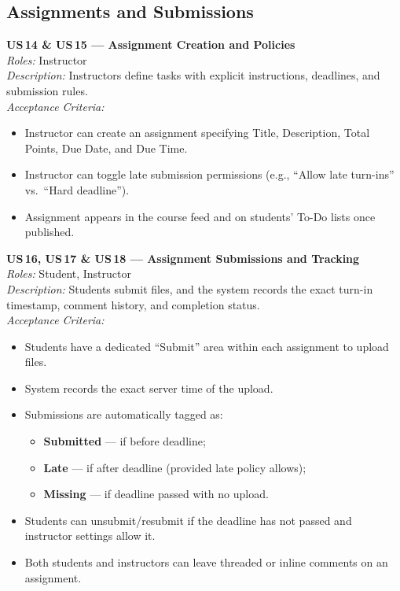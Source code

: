 \documentclass[12pt, a4paper]{article}
\begin{document}
\subsection{Assignments and Submissions}

\begin{userstory}
  \textbf{US\,14 \& US\,15 — Assignment Creation and Policies}\\[4pt]
  \textit{Roles:} Instructor\\[2pt]
  \textit{Description:} Instructors define tasks with explicit instructions,
  deadlines, and submission rules.\\[4pt]
  \textit{Acceptance Criteria:}
  \begin{itemize}
    \item Instructor can create an assignment specifying Title, Description,
          Total Points, Due Date, and Due Time.
    \item Instructor can toggle late submission permissions (e.g., ``Allow
          late turn-ins'' vs.\ ``Hard deadline'').
    \item Assignment appears in the course feed and on students' To-Do lists
          once published.
  \end{itemize}
\end{userstory}

\begin{userstory}
  \textbf{US\,16, US\,17 \& US\,18 — Assignment Submissions and Tracking}\\[4pt]
  \textit{Roles:} Student, Instructor\\[2pt]
  \textit{Description:} Students submit files, and the system records the
  exact turn-in timestamp, comment history, and completion status.\\[4pt]
  \textit{Acceptance Criteria:}
  \begin{itemize}
    \item Students have a dedicated ``Submit'' area within each assignment to
          upload files.
    \item System records the exact server time of the upload.
    \item Submissions are automatically tagged as:\
      \begin{itemize}
        \item \textbf{Submitted} — if before deadline;
        \item \textbf{Late} — if after deadline (provided late policy allows);
        \item \textbf{Missing} — if deadline passed with no upload.
      \end{itemize}
    \item Students can unsubmit/resubmit if the deadline has not passed and
          instructor settings allow it.
    \item Both students and instructors can leave threaded or inline comments
          on an assignment.
  \end{itemize}
\end{userstory}
\end{document}

